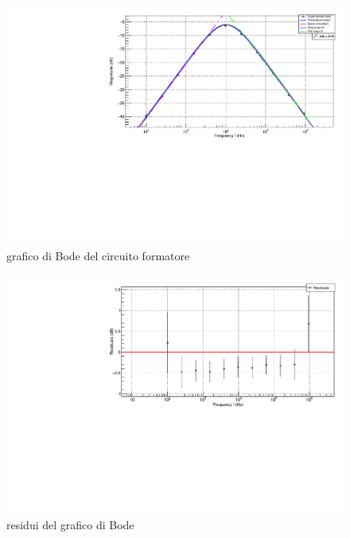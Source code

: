 \documentclass{article}
\begin{document}
\begin{center}
    \begin{figure}[H]
    \centering
    \includegraphics[scale=0.375, angle=0]{bodeshaper_no_pz.pdf}
    \caption{grafico di Bode del circuito formatore}
    \label{fig:bodeshaper_no_pz}
    \end{figure}
\end{center}

\begin{center}
    \begin{figure}[H]
    \centering
    \includegraphics[scale=0.3875, angle=0]{bodeshaperresidui_no_pz.pdf}
    \caption{ residui del grafico di Bode }
    \label{fig:bodeshaperresidui_no_pz}
    \end{figure}
\end{center}
\end{document}
